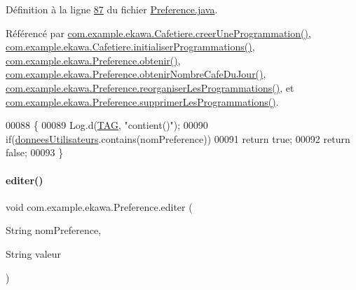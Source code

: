 Définition à la ligne \hyperlink{_preference_8java_source_l00087}{87} du fichier \hyperlink{_preference_8java_source}{Preference.\+java}.



Référencé par \hyperlink{_cafetiere_8java_source_l00731}{com.\+example.\+ekawa.\+Cafetiere.\+creer\+Une\+Programmation()}, \hyperlink{_cafetiere_8java_source_l00692}{com.\+example.\+ekawa.\+Cafetiere.\+initialiser\+Programmations()}, \hyperlink{_preference_8java_source_l00052}{com.\+example.\+ekawa.\+Preference.\+obtenir()}, \hyperlink{_preference_8java_source_l00063}{com.\+example.\+ekawa.\+Preference.\+obtenir\+Nombre\+Cafe\+Du\+Jour()}, \hyperlink{_preference_8java_source_l00157}{com.\+example.\+ekawa.\+Preference.\+reorganiser\+Les\+Programmations()}, et \hyperlink{_preference_8java_source_l00142}{com.\+example.\+ekawa.\+Preference.\+supprimer\+Les\+Programmations()}.


\begin{DoxyCode}
00088     \{
00089         Log.d(\hyperlink{classcom_1_1example_1_1ekawa_1_1_preference_aeb5e1e787153c37929839622ac5d0339}{TAG}, \textcolor{stringliteral}{"contient()"});
00090         \textcolor{keywordflow}{if}(\hyperlink{classcom_1_1example_1_1ekawa_1_1_preference_a5ac49439bd1c8c3ff12dd9eb2475b894}{donneesUtilisateurs}.contains(nomPreference))
00091             \textcolor{keywordflow}{return} \textcolor{keyword}{true};
00092         \textcolor{keywordflow}{return} \textcolor{keyword}{false};
00093     \}
\end{DoxyCode}
\mbox{\label{classcom_1_1example_1_1ekawa_1_1_preference_a5af7a0595acfd41f1bd0b34ca0bfcb2a}} 
\paragraph{\texorpdfstring{editer()}{editer()}\hspace{0.1cm}{\footnotesize\ttfamily [1/3]}}
{\footnotesize\ttfamily void com.\+example.\+ekawa.\+Preference.\+editer (\begin{DoxyParamCaption}\item[{String}]{nom\+Preference,  }\item[{String}]{valeur }\end{DoxyParamCaption})}



